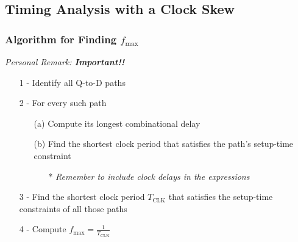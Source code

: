 \documentclass[12pt,openany]{book}
\begin{document}
\subsection{Timing Analysis with a Clock Skew}
\subsubsection*{Algorithm for Finding \( f_{\text{max}} \)}
\textit{Personal Remark: \textbf{Important!!}}\newline
\begin{justify}
	\begin{itemize}		
		\setlength\itemsep{2px}
	    \item[1 -] Identify all Q-to-D paths
	    \item[2 -] For every such path
	    \begin{itemize}
			\setlength\itemsep{2px}
	        \item[(a)] Compute its longest combinational delay
	        \item[(b)] Find the shortest clock period that satisfies the path's setup-time constraint
	        \begin{itemize}
	            \item[*] \textit{Remember to include clock delays in the expressions}
	        \end{itemize}
	    \end{itemize}
	    \item[3 -] Find the shortest clock period \( T_{\text{CLK}} \) that satisfies the setup-time constraints of all those paths
	    \item[4 -] Compute \( f_{\text{max}} = \frac{1}{T_{\text{CLK}}} \)
	\end{itemize}
\end{justify}
\end{document}
